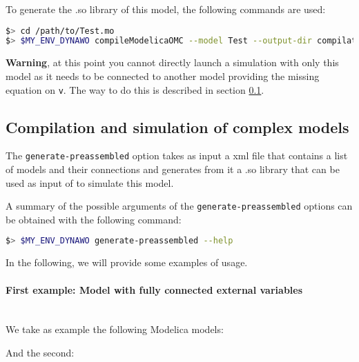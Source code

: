 \documentclass[a4paper, 12pt]{report}
\begin{document}


To generate the .so library of this model, the following commands are used:
\begin{lstlisting}[language=bash,deletekeywords={jobs,help}]
$> cd /path/to/Test.mo
$> $MY_ENV_DYNAWO compileModelicaOMC --model Test --output-dir compilation  --input-dir . --lib Test.so
\end{lstlisting}

\textbf{Warning}, at this point you cannot directly launch a simulation with only this model as it needs to be connected to another model providing the missing equation on \lstinline[language=Modelica]{v}. The way to do this is described in section \ref{Dynawo_Advanced_Documentation_Dynawo_executables_Dydlib}.

\subsection{Compilation and simulation of complex models}
\label{Dynawo_Advanced_Documentation_Dynawo_executables_Dydlib}

The \lstinline[language=bash]{generate-preassembled} option takes as input a xml file that contains a list of models and their connections and generates from it a .so library that can be used as input of \Dynawo to simulate this model.

A summary of the possible arguments of the \lstinline[language=bash]{generate-preassembled} options can be obtained with the following command:

\begin{lstlisting}[language=bash,deletekeywords={jobs,help}]
$> $MY_ENV_DYNAWO generate-preassembled --help
\end{lstlisting}

In the following, we will provide some examples of usage.

\paragraph{First example: Model with fully connected external variables}
~~\\
We take as example the following Modelica models:


And the second:

\end{document}
